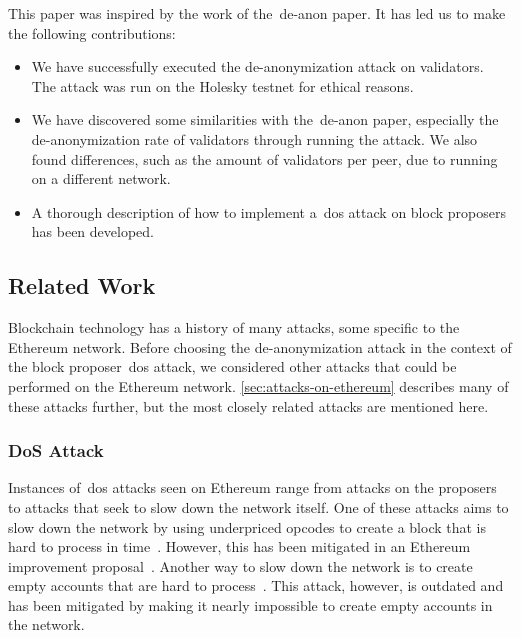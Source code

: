 This paper was inspired by the work of the~\gls{de-anon paper}.
It has led us to make the following contributions:
\begin{itemize}
    \item We have successfully executed the de-anonymization attack on validators.
    The attack was run on the Holesky testnet for ethical reasons.
    \item We have discovered some similarities with the~\gls{de-anon paper}, especially the de-anonymization rate of validators through running the attack.
    We also found differences, such as the amount of validators per peer, due to running on a different network.
    \item A thorough description of how to implement a~\gls{dos} attack on block proposers has been developed.
\end{itemize}

\subsection*{Related Work}\label{subsec:related-work}
Blockchain technology has a history of many attacks, some specific to the Ethereum network.
Before choosing the de-anonymization attack in the context of the block proposer~\gls{dos} attack, we considered other attacks that could be performed on the Ethereum network.
\autoref{sec:attacks-on-ethereum} describes many of these attacks further, but the most closely related attacks are mentioned here.


\subsubsection*{DoS Attack}\label{subsubsec:dos-attack}
Instances of~\gls{dos} attacks seen on Ethereum range from attacks on the proposers to attacks that seek to slow down the network itself.
One of these attacks aims to slow down the network by using underpriced opcodes to create a block that is hard to process in time~\cite{10.1145/3391195,9815256}.
However, this has been mitigated in an Ethereum improvement proposal~\cite{Opcode-mitigation}.
Another way to slow down the network is to create empty accounts that are hard to process~\cite{empty-account-mitigation,empty-account-eip-mitigation}.
This attack, however, is outdated and has been mitigated by making it nearly impossible to create empty accounts in the network.


